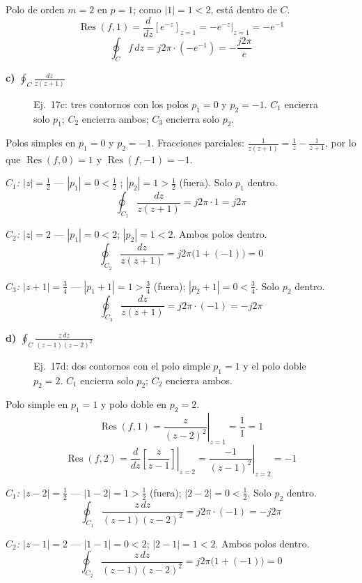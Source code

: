 \documentclass[10pt,a4paper]{article}
\begin{document}
Polo de orden $m=2$ en $p=1$; como $|1|=1<2$, está dentro de $C$.
\[
	\operatorname{Res}(f,1)
	= \frac{d}{dz}\!\left[e^{-z}\right]_{z=1}
	= -e^{-z}\big|_{z=1} = -e^{-1}
\]
\[
	\boxed{\oint_C f\,dz = j2\pi\cdot(-e^{-1}) = -\frac{j2\pi}{e}}
\]

\bigskip

\noindent\textbf{c) $\displaystyle\oint_C\frac{dz}{z(z+1)}$}

\begin{figure}[H]\centering
	
	\caption{Ej.~17c: tres contornos con los polos $p_1=0$ y $p_2=-1$. $C_1$ encierra solo $p_1$; $C_2$ encierra ambos; $C_3$ encierra solo $p_2$.}
	\label{fig:tray17c}
\end{figure}

Polos simples en $p_1=0$ y $p_2=-1$. Fracciones parciales: $\frac{1}{z(z+1)}=\frac{1}{z}-\frac{1}{z+1}$, por lo que $\operatorname{Res}(f,0)=1$ y $\operatorname{Res}(f,-1)=-1$.

\smallskip
\noindent\textit{$C_1$: $|z|=\tfrac{1}{2}$} — $|p_1|=0<\tfrac{1}{2}$ \checkmark;\; $|p_2|=1>\tfrac{1}{2}$ (fuera). Solo $p_1$ dentro.
\[
	\boxed{\oint_{C_1}\frac{dz}{z(z+1)} = j2\pi\cdot 1 = j2\pi}
\]

\noindent\textit{$C_2$: $|z|=2$} — $|p_1|=0<2$\checkmark;\; $|p_2|=1<2$\checkmark. Ambos polos dentro.
\[
	\boxed{\oint_{C_2}\frac{dz}{z(z+1)} = j2\pi\bigl(1+(-1)\bigr) = 0}
\]

\noindent\textit{$C_3$: $|z+1|=\tfrac{3}{4}$} — $|p_1+1|=1>\tfrac{3}{4}$ (fuera);\; $|p_2+1|=0<\tfrac{3}{4}$\checkmark. Solo $p_2$ dentro.
\[
	\boxed{\oint_{C_3}\frac{dz}{z(z+1)} = j2\pi\cdot(-1) = -j2\pi}
\]
 
\bigskip

\noindent\textbf{d) $\displaystyle\oint_C\frac{z\,dz}{(z-1)(z-2)^2}$}

\begin{figure}[H]\centering
	
	\caption{Ej.~17d: dos contornos con el polo simple $p_1=1$ y el polo doble $p_2=2$. $C_1$ encierra solo $p_2$; $C_2$ encierra ambos.}
	\label{fig:tray17d}
\end{figure}

Polo simple en $p_1=1$ y polo doble en $p_2=2$.
\[
	\operatorname{Res}(f,1) = \left.\frac{z}{(z-2)^2}\right|_{z=1} = \frac{1}{1} = 1
\]
\[
	\operatorname{Res}(f,2) = \left.\frac{d}{dz}\!\left[\frac{z}{z-1}\right]\right|_{z=2}
	= \left.\frac{-1}{(z-1)^2}\right|_{z=2} = -1
\]

\noindent\textit{$C_1$: $|z-2|=\tfrac{1}{2}$} — $|1-2|=1>\tfrac{1}{2}$ (fuera);\; $|2-2|=0<\tfrac{1}{2}$\checkmark. Solo $p_2$ dentro.
\[
	\boxed{\oint_{C_1}\frac{z\,dz}{(z-1)(z-2)^2} = j2\pi\cdot(-1) = -j2\pi}
\]

\noindent\textit{$C_2$: $|z-1|=2$} — $|1-1|=0<2$\checkmark;\; $|2-1|=1<2$\checkmark. Ambos polos dentro.
\[
	\boxed{\oint_{C_2}\frac{z\,dz}{(z-1)(z-2)^2} = j2\pi\bigl(1+(-1)\bigr) = 0}
\]
\end{document}
